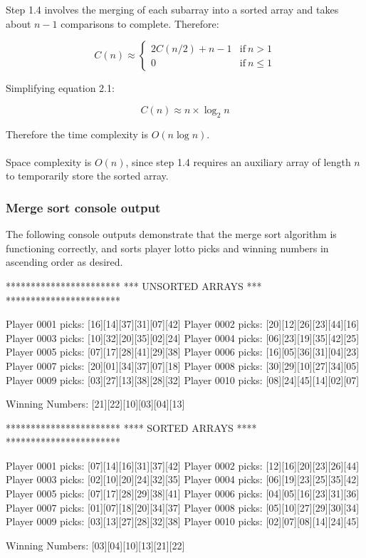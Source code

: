 Step 1.4 involves the merging of each subarray into a sorted array and takes about $n - 1$ comparisons to complete. Therefore:

\begin{equation}
C(n) \approx \left\{\begin{matrix}
2C(n/2) + n - 1 & \mbox{if} \ n > 1 \\ 
0 & \mbox{if} \ n \leq 1 
\end{matrix}\right.
\end{equation}

\newpage
\noindent
Simplifying equation 2.1:

\begin{equation}
C(n) \approx n \times \log_2n
\end{equation}

\noindent
Therefore the time complexity is $O(n \log n)$.
\\
\\
Space complexity is $O(n)$, since step 1.4 requires an auxiliary array of length $n$ to temporarily store the sorted array.

\subsubsection{Merge sort console output}

The following console outputs demonstrate that the merge sort algorithm is functioning correctly, and sorts player lotto picks and winning numbers in ascending order as desired.
\\
\begin{consolecode}
***********************
*** UNSORTED ARRAYS ***
***********************

Player 0001 picks: [16][14][37][31][07][42]
Player 0002 picks: [20][12][26][23][44][16]
Player 0003 picks: [10][32][20][35][02][24]
Player 0004 picks: [06][23][19][35][42][25]
Player 0005 picks: [07][17][28][41][29][38]
Player 0006 picks: [16][05][36][31][04][23]
Player 0007 picks: [20][01][34][37][07][18]
Player 0008 picks: [30][29][10][27][34][05]
Player 0009 picks: [03][27][13][38][28][32]
Player 0010 picks: [08][24][45][14][02][07]

Winning Numbers:   [21][22][10][03][04][13]
\end{consolecode}

\begin{consolecode}
***********************
**** SORTED ARRAYS ****
***********************

Player 0001 picks: [07][14][16][31][37][42]
Player 0002 picks: [12][16][20][23][26][44]
Player 0003 picks: [02][10][20][24][32][35]
Player 0004 picks: [06][19][23][25][35][42]
Player 0005 picks: [07][17][28][29][38][41]
Player 0006 picks: [04][05][16][23][31][36]
Player 0007 picks: [01][07][18][20][34][37]
Player 0008 picks: [05][10][27][29][30][34]
Player 0009 picks: [03][13][27][28][32][38]
Player 0010 picks: [02][07][08][14][24][45]

Winning Numbers:   [03][04][10][13][21][22]
\end{consolecode}


